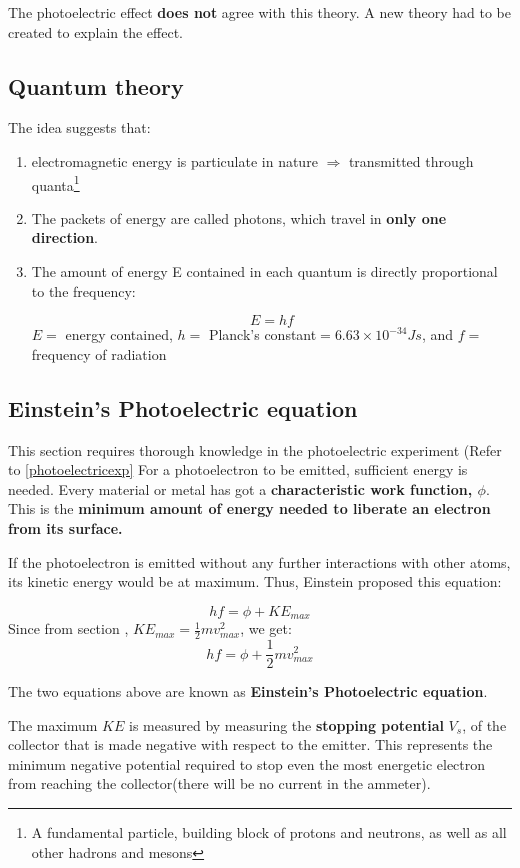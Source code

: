 The photoelectric effect \textbf{does not} agree with this theory. A new theory had to be created to explain the effect.

\subsection{Quantum theory}
The idea suggests that:
	\begin{enumerate}
	\item electromagnetic energy is particulate in nature $\Longrightarrow$ transmitted through quanta\footnote{A fundamental particle, building block of protons and neutrons, as well as all other hadrons and mesons}
	\item The packets of energy are called photons, which travel in \textbf{only one direction}.
	\item The amount of energy E contained in each quantum is directly proportional to the frequency:
	\begin{form}
	$$E=hf$$
	$E=$ energy contained, 
	$h =$ Planck's constant$ = 6.63 \times 10^{-34} J s$\label{planckconst}, and
	$f =$ frequency of radiation
	\end{form}
	\end{enumerate}
\subsection{Einstein's Photoelectric equation}
This section requires thorough knowledge in the photoelectric experiment (Refer to \ref{photoelectricexp}
For a photoelectron to be emitted, sufficient energy is needed. Every material or metal has got a \textbf{characteristic work function, $\phi$}. This is the \textbf{minimum amount of energy needed to liberate an electron from its surface.} 

If the photoelectron is emitted without any further interactions with other atoms, its kinetic energy would be at maximum. Thus, Einstein proposed this equation:
\begin{form}
$$hf = \phi + KE_{max}$$
Since from section , $KE_{max} = \frac{1}{2}mv^2_{max}$, we get:
$$hf=\phi + \frac{1}{2}mv^2_{max}$$
\end{form}
The two equations above are known as \textbf{Einstein's Photoelectric equation}.

The maximum $KE$ is measured by measuring the \textbf{stopping potential }$V_s$, of the collector that is made negative with respect to the emitter. This represents the minimum negative potential required to stop even the most energetic electron from reaching the collector(there will be no current in the ammeter).


